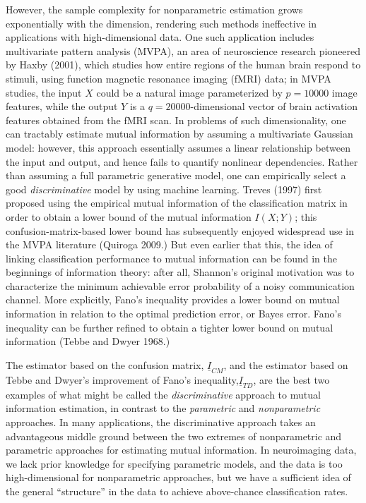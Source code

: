 \documentclass{article}
\begin{document}
However, the sample complexity for nonparametric estimation grows
exponentially with the dimension, rendering such methods ineffective
in applications with high-dimensional data.  One such application
includes multivariate pattern analysis (MVPA), an area of neuroscience
research pioneered by Haxby (2001), which studies how entire regions
of the human brain respond to stimuli, using function magnetic
resonance imaging (fMRI) data; in MVPA studies, the input $X$ could be
a natural image parameterized by $p = 10000$ image features, while the
output $Y$ is a $q=20000$-dimensional vector of brain activation
features obtained from the fMRI scan.  In problems of such
dimensionality, one can tractably estimate mutual information by
assuming a multivariate Gaussian model: however, this approach
essentially assumes a linear relationship between the input and
output, and hence fails to quantify nonlinear dependencies.  Rather
than assuming a full parametric generative model, one can empirically
select a good \emph{discriminative} model by using machine learning.
Treves (1997) first proposed using the empirical mutual information of
the classification matrix in order to obtain a lower bound of the
mutual information $I(X; Y)$; this confusion-matrix-based lower bound
has subsequently enjoyed widespread use in the MVPA literature
(Quiroga 2009.)  But even earlier that this, the idea of linking
classification performance to mutual information can be found in the
beginnings of information theory: after all, Shannon's original
motivation was to characterize the minimum achievable error
probability of a noisy communication channel.  More explicitly, Fano's
inequality provides a lower bound on mutual information in relation to
the optimal prediction error, or Bayes error.  Fano's inequality can
be further refined to obtain a tighter lower bound on mutual
information (Tebbe and Dwyer 1968.)

The estimator based on the confusion matrix, $\underline{I}_{CM}$, and
the estimator based on Tebbe and Dwyer's improvement of Fano's
inequality,$\underline{I}_{TD}$, are the best two examples of what
might be called the \emph{discriminative} approach to mutual
information estimation, in contrast to the \emph{parametric} and
\emph{nonparametric} approaches.  In many applications, the
discriminative approach takes an advantageous middle ground between
the two extremes of nonparametric and parametric approaches for
estimating mutual information. In neuroimaging data, we lack prior
knowledge for specifying parametric models, and the data is too
high-dimensional for nonparametric approaches, but we have a
sufficient idea of the general ``structure'' in the data to achieve
above-chance classification rates.
\end{document}
